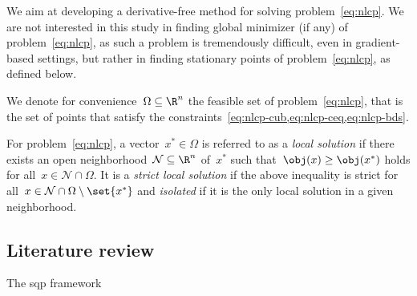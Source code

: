 We aim at developing a derivative-free method for solving problem~\cref{eq:nlcp}.
We are not interested in this study in finding global minimizer (if any) of problem~\cref{eq:nlcp}, as such a problem is tremendously difficult, even in gradient-based settings, but rather in finding stationary points of problem~\cref{eq:nlcp}, as defined below.

We denote for convenience~$\Omega \subseteq \R^n$ the feasible set of problem~\cref{eq:nlcp}, that is the set of points that satisfy the constraints~\cref{eq:nlcp-cub,eq:nlcp-ceq,eq:nlcp-bds}.

\begin{definition}
    For problem~\cref{eq:nlcp}, a vector~$x^{\ast} \in \Omega$ is referred to as a \emph{local solution} if there exists an open neighborhood~$\mathcal{N} \subseteq \R^n$ of~$x^{\ast}$ such that~$\obj(x) \ge \obj(x^{\ast})$ holds for all~$x \in \mathcal{N} \cap \Omega$.
    It is a \emph{strict local solution} if the above inequality is strict for all~$x \in \mathcal{N} \cap \Omega \setminus \set{x^{\ast}}$ and \emph{isolated} if it is the only local solution in a given neighborhood.
\end{definition}


\subsection{Literature review}

The \gls{sqp} framework~\cite{Han_1976,Han_1977,Powell_1978a,Powell_1978b,Wilson_1963}
